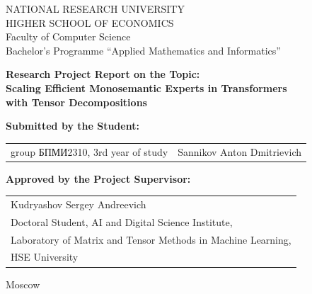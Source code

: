\begin{titlepage}
\newpage

{
\begin{center}
NATIONAL RESEARCH UNIVERSITY\\
HIGHER SCHOOL OF ECONOMICS
\\
\bigskip
Faculty of Computer Science\\
Bachelor's Programme ``Applied Mathematics and Informatics''
\end{center}
}

\vspace{4em}

\begin{center}
{\bf Research Project Report on the Topic:}\\
{\bf Scaling Efficient Monosemantic Experts in Transformers\\
with Tensor Decompositions}
\end{center}

\vspace{2em}

{\bf Submitted by the Student: \vspace{2mm}}

{
\begin{tabular}{l@{\hskip 1.5cm}l}
group \foreignlanguage{russian}{БПМИ}2310, 3rd year of study &
Sannikov Anton Dmitrievich \\
\end{tabular}}

\vspace{1.5em}

{\bf Approved by the Project Supervisor: \vspace{2mm}}

{\noindent\hspace*{1.25cm}
\begin{tabular}{l}
Kudryashov Sergey Andreevich \\
Doctoral Student, AI and Digital Science Institute, \\
Laboratory of Matrix and Tensor Methods in Machine Learning, \\
HSE University
\end{tabular}}

\vspace{\fill}

\begin{center}
Moscow \the\year
\end{center}

\end{titlepage}
